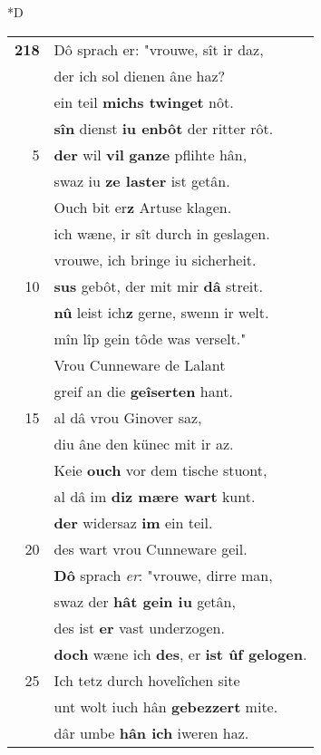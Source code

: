 \documentclass[8pt,a4paper,notitlepage]{article}
\begin{document}
\begin{table}[ht]
\begin{minipage}[t]{0.5\linewidth}
\small
\begin{center}*D
\end{center}
\begin{tabular}{rl}
\textbf{218} & Dô sprach er: "vrouwe, sît ir daz,\\ 
 & der ich sol dienen âne haz?\\ 
 & ein teil \textbf{michs twinget} nôt.\\ 
 & \textbf{sîn} dienst \textbf{iu enbôt} der ritter rôt.\\ 
5 & \textbf{der} wil \textbf{vil} \textbf{ganze} pflihte hân,\\ 
 & swaz iu \textbf{ze laster} ist getân.\\ 
 & Ouch bit er\textbf{z} Artuse klagen.\\ 
 & ich wæne, ir sît durch in geslagen.\\ 
 & vrouwe, ich bringe iu sicherheit.\\ 
10 & \textbf{sus} gebôt, der mit mir \textbf{dâ} streit.\\ 
 & \textbf{nû} leist ich\textbf{z} gerne, swenn ir welt.\\ 
 & mîn lîp gein tôde was verselt."\\ 
 & Vrou Cunneware de Lalant\\ 
 & greif an die \textbf{geîserten} hant.\\ 
15 & al dâ vrou Ginover saz,\\ 
 & diu âne den künec mit ir az.\\ 
 & Keie \textbf{ouch} vor dem tische stuont,\\ 
 & al dâ im \textbf{diz mære wart} kunt.\\ 
 & \textbf{der} widersaz \textbf{im} ein teil.\\ 
20 & des wart vrou Cunneware geil.\\ 
 & \textbf{Dô} sprach \textit{er}: "vrouwe, dirre man,\\ 
 & swaz der \textbf{hât gein iu} getân,\\ 
 & des ist \textbf{er} vast underzogen.\\ 
 & \textbf{doch} wæne ich \textbf{des}, er \textbf{ist ûf gelogen}.\\ 
25 & Ich tetz durch hovelîchen site\\ 
 & unt wolt iuch hân \textbf{gebezzert} mite.\\ 
 & dâr umbe \textbf{hân ich} iweren haz.\\ 

\end{tabular}
\end{minipage}
\end{table}
\end{document}
